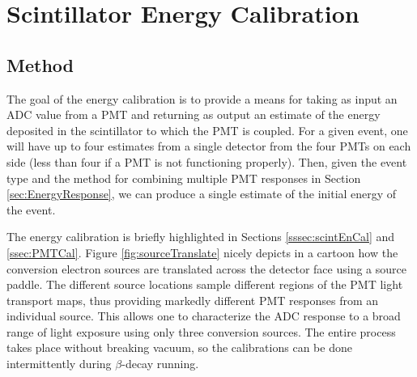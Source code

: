 





\section{Scintillator Energy Calibration}

\subsection{Method}

The goal of the energy calibration is to provide a means for taking as input an ADC value
from a PMT and returning as output an estimate of the energy deposited in the scintillator
to which the PMT is coupled. For a given event, one will have up to four estimates from a
single detector from the four PMTs on each side (less than four if a PMT is not functioning
properly). Then, given the event type and the method for combining multiple PMT responses in
Section \ref{sec:EnergyResponse}, we can produce a single estimate of the initial energy of
the event.

The energy calibration is briefly highlighted in Sections \ref{sssec:scintEnCal} and
\ref{ssec:PMTCal}. Figure \ref{fig:sourceTranslate} nicely depicts in a cartoon how
the conversion electron sources are translated across the detector face using a source
paddle. The different source locations sample different regions of the PMT light transport
maps, thus providing markedly different PMT responses from an individual source. This allows
one to characterize the ADC response to a broad range of light exposure using only three conversion sources.
The entire process takes place without breaking vacuum, so the calibrations can be done
intermittently during $\beta$-decay running.

